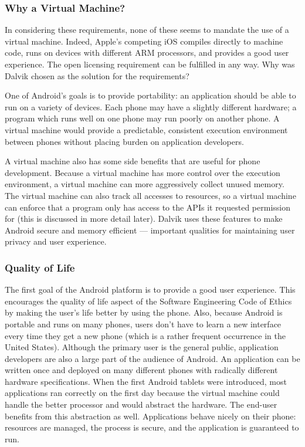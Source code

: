 \documentclass[11pt]{article}
\begin{document}
\begin{multicols}{2}

\subsubsection{Why a Virtual Machine?} %
\label{ssub:why-vm}

In considering these requirements, none of these seems to mandate the use of a
virtual machine.  Indeed, Apple's competing iOS compiles directly to machine
code, runs on devices with different ARM processors, and provides a good user
experience.  The open licensing requirement can be fulfilled in any way.  Why
was Dalvik chosen as the solution for the requirements?

One of Android's goals is to provide portability: an application should be able
to run on a variety of devices.  Each phone may have a slightly different
hardware; a program which runs well on one phone may run poorly on another
phone.  A virtual machine would provide a predictable, consistent execution
environment between phones without placing burden on application developers.

A virtual machine also has some side benefits that are useful for phone
development.  Because a virtual machine has more control over the execution
environment, a virtual machine can more aggressively collect unused memory.  The
virtual machine can also track all accesses to resources, so a virtual machine
can enforce that a program only has access to the APIs it requested permission
for (this is discussed in more detail later).  Dalvik uses these features to
make Android secure and memory efficient --- important qualities for maintaining
user privacy and user experience.


\subsubsection{Quality of Life} %
\label{ssub:quality}

The first goal of the Android platform is to provide a good user experience.
This encourages the quality of life aspect of the Software Engineering Code of
Ethics by making the user's life better by using the phone.  Also, because
Android is portable and runs on many phones, users don't have to learn a new
interface every time they get a new phone (which is a rather frequent occurrence
in the United States).  Although the primary user is the general public,
application developers are also a large part of the audience of Android.  An
application can be written once and deployed on many different phones with
radically different hardware specifications.  When the first Android tablets
were introduced, most applications ran correctly on the first day because the
virtual machine could handle the better processor and would abstract the
hardware.  The end-user benefits from this abstraction as well.  Applications
behave nicely on their phone: resources are managed, the process is secure, and
the application is guaranteed to run.


\end{multicols}
\end{document}
